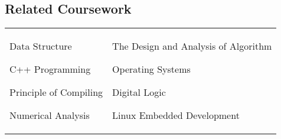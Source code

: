 \documentclass[margin,line,pifont,palatino,courier]{res}
\newenvironment{list1}{
	\begin{list}{\ding{113}}{%
			\setlength{\itemsep}{0in}
			\setlength{\parsep}{0in} \setlength{\parskip}{0in}
			\setlength{\topsep}{0in} \setlength{\partopsep}{0in}
			\setlength{\leftmargin}{0.17in}}}{\end{list}}
\begin{document}
\begin{resume}

\section{\sc Related Coursework}

\begin{tabular}{@{}p{2in}p{3in}}
	\begin{list1}
		\item Data Structure
		\item C++ Programming
		\item Principle of Compiling
		\item Numerical Analysis
	\end{list1}
	&
	\begin{list1}
		\item The Design and Analysis of Algorithm
		\item Operating Systems
		\item Digital Logic
		\item Linux Embedded Development
	\end{list1}
	
\end{tabular}

%		
		
		
	\end{resume}
\end{document}
